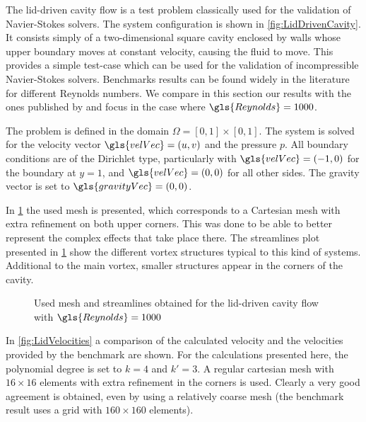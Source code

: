 The lid-driven cavity flow is a test problem classically used for the validation of Navier-Stokes solvers. The system configuration is shown in \cref{fig:LidDrivenCavity}. It consists simply of a two-dimensional square cavity  enclosed by walls whose upper boundary moves at constant velocity, causing the fluid to move. This provides a simple test-case which can be used for the validation of incompressible Navier-Stokes solvers. Benchmarks results can be found widely in the literature for different Reynolds numbers. We compare in this section our results with the ones published by \cite{botellaBenchmarkSpectralResults1998} and focus in the case where $\gls{Reynolds} = 1000$.

The problem is defined in the domain $\Omega = [0,1]\times [0,1]$. The system is solved for the velocity vector $\gls{velVec} = (u,v)$ and the pressure $p$. All boundary conditions are of the Dirichlet type, particularly with $\gls{velVec} = (-1,0)$ for the boundary at $y = 1$, and $\gls{velVec} = (0,0)$ for all other sides. The gravity vector is set to $\gls{gravityVec} = (0,0)$.

In \cref{fig:LiddrivenMesh} the used mesh is presented, which corresponds to a Cartesian mesh with extra refinement on both upper corners. This was done to be able to better represent the complex effects that take place there.  The streamlines plot presented in \cref{fig:LiddrivenMesh} show the different vortex structures typical to this kind of systems. Additional to the main vortex, smaller structures appear in the corners of the cavity.

\begin{figure}[t]
	\centering
	\pgfplotsset{width=0.35 \textwidth, compat=1.3}
	\caption{Used mesh and streamlines obtained for the lid-driven cavity flow with $\gls{Reynolds} = 1000$} \label{fig:LiddrivenMesh}
\end{figure}

In \cref{fig:LidVelocities} a comparison of the calculated velocity and the velocities provided by the benchmark are shown. For the calculations presented here, the polynomial degree is set to $k = 4$ and $k' = 3$. A regular cartesian mesh with $16\times16$ elements with extra refinement in the corners is used. Clearly a very good agreement is obtained, even by using a relatively coarse mesh (the benchmark result uses a grid with $160\times160$ elements).

